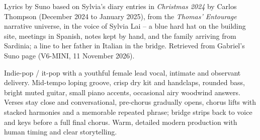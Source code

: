 
\label{sec:learning-how-to-stand-here}
\begin{notes}
Lyrics by Suno based on Sylvia's diary entries in \emph{Christmas 2024} by Carlos Thompson (December 2024 to January 2025), from the \emph{Thomas' Entourage} narrative universe, in the voice of Sylvia Lai -- a blue hard hat on the building site, meetings in Spanish, notes kept by hand, and the family arriving from Sardinia; a line to her father in Italian in the bridge. Retrieved from Gabriel's Suno page (V6-MINI, 11 November 2026).
\end{notes}
\begin{style}
Indie-pop / it-pop with a youthful female lead vocal, intimate and observant delivery. Mid-tempo loping groove, crisp dry kit and handclaps, rounded bass, bright muted guitar, small piano accents, occasional airy woodwind answers. Verses stay close and conversational, pre-chorus gradually opens, chorus lifts with stacked harmonies and a memorable repeated phrase; bridge strips back to voice and keys before a full final chorus. Warm, detailed modern production with human timing and clear storytelling.
\end{style}
